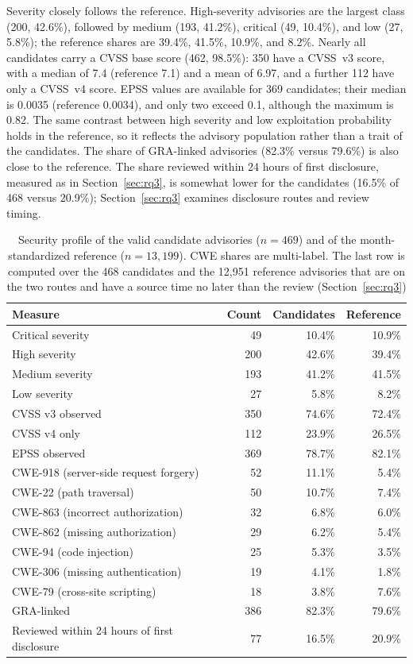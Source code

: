 \documentclass[smallextended,natbib]{svjour3}
\begin{document}
Severity closely follows the reference.  High-severity advisories are the
largest class (200, 42.6\%), followed by medium (193, 41.2\%), critical (49,
10.4\%), and low (27, 5.8\%); the reference shares are 39.4\%, 41.5\%,
10.9\%, and 8.2\%.  Nearly all candidates carry a CVSS base score (462,
98.5\%): 350 have a CVSS~v3 score, with a median of 7.4 (reference 7.1) and a
mean of 6.97, and a further 112 have only a CVSS~v4 score.  EPSS values are
available for 369 candidates; their median is 0.0035 (reference 0.0034), and
only two exceed 0.1, although the maximum is 0.82.  The same contrast between
high severity and low exploitation probability holds in the reference, so it
reflects the advisory population rather than a trait of the candidates.  The
share of GRA-linked advisories (82.3\% versus 79.6\%) is also close to the
reference.  The share reviewed within 24 hours of first disclosure, measured as
in Section~\ref{sec:rq3}, is somewhat lower for the candidates (16.5\% of 468
versus 20.9\%); Section~\ref{sec:rq3} examines disclosure routes and review
timing.

\begin{table}[t]
\caption{Security profile of the valid candidate advisories ($n=469$) and of
the month-standardized reference ($n=13{,}199$). CWE shares are multi-label.
The last row is computed over the 468 candidates and the 12{,}951 reference
advisories that are on the two routes and have a source time no later than the
review (Section~\ref{sec:rq3})}
\label{tab:security}
\centering
\begin{tabular}{lrrr}
\toprule
Measure & Count & Candidates & Reference \\
\midrule
Critical severity & 49 & 10.4\% & 10.9\% \\
High severity & 200 & 42.6\% & 39.4\% \\
Medium severity & 193 & 41.2\% & 41.5\% \\
Low severity & 27 & 5.8\% & 8.2\% \\
\midrule
CVSS v3 observed & 350 & 74.6\% & 72.4\% \\
CVSS v4 only & 112 & 23.9\% & 26.5\% \\
EPSS observed & 369 & 78.7\% & 82.1\% \\
\midrule
CWE-918 (server-side request forgery) & 52 & 11.1\% & 5.4\% \\
CWE-22 (path traversal) & 50 & 10.7\% & 7.4\% \\
CWE-863 (incorrect authorization) & 32 & 6.8\% & 6.0\% \\
CWE-862 (missing authorization) & 29 & 6.2\% & 5.4\% \\
CWE-94 (code injection) & 25 & 5.3\% & 3.5\% \\
CWE-306 (missing authentication) & 19 & 4.1\% & 1.8\% \\
CWE-79 (cross-site scripting) & 18 & 3.8\% & 7.6\% \\
\midrule
GRA-linked & 386 & 82.3\% & 79.6\% \\
Reviewed within 24 hours of first disclosure & 77 & 16.5\% & 20.9\% \\
\bottomrule
\end{tabular}
\end{table}
\end{document}
